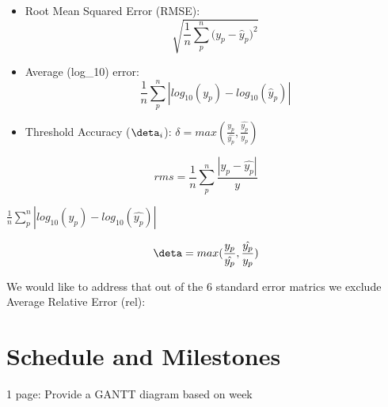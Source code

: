 \begin{itemize}
    
    \item Root Mean Squared Error (RMSE):
    \begin{equation} \label{RMSE}
        \sqrt{\frac{1}{n} \sum_{p}^{n}{(y_{p} - \hat{y}_{p}})^2}
    \end{equation}
    
    \item Average ({log_{10}}) error: 
    \begin{equation} \label{avg_log}
        \frac{1}{n} \sum_{p}^{n} \left|log_{10}(y_{p}) - log_{10}(\hat{y}_{p}) \right|
    \end{equation}
   
    \item Threshold Accuracy (\(\deta_{i}\)): \({\delta = max (\frac{{y_{p}}}{\hat{y_{p}}}, \frac{\hat{y_{p}}}{{y_{p}}})}\)
\end{itemize}{}

\begin{equation} \label{rms}
    {rms =  \frac{1}{n} \sum_{p}^{n} \frac{\left|y_{p} - \hat{y_{p}}\right|}{y}}
\end{equation}



 \({\frac{1}{n} \sum_{p}^{n} \left|log_{10}(y_{p}) - log_{10}(\hat{y_{p}}) \right|}\)

\begin{equation} \label{accuracy}
    {\deta = max (\frac{{y_{p}}}{\hat{y_{p}}}, \frac{\hat{y_{p}}}{{y_{p}}})}
\end{equation}


\newpage






We would like to address that out of the 6 standard error matrics we exclude Average Relative Error (rel): 


\section{Schedule and Milestones}
1 page: Provide a GANTT diagram based on week
